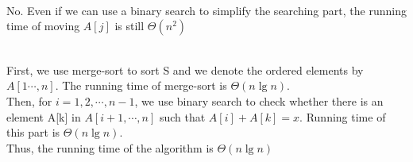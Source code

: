 \\
No. Even if we can use a binary search to simplify the searching part, 
the running time of moving $A[j]$ is still $\Theta(n^2)$


\\
First, we use merge-sort to sort S and we denote the ordered elements by $A[1\cdots,n]$.
The running time of merge-sort is $ \Theta(n \lg n) $.\\
Then, for $ i=1,2,\cdots,n-1 $, we use binary search to check whether there is
an element A[k] in $ A[i+1,\cdots,n] $ such that $ A[i]+A[k]=x $. Running time of this part is $ \Theta(n\lg n) $.\\
Thus, the running time of the algorithm is $\Theta(n\lg n)$
